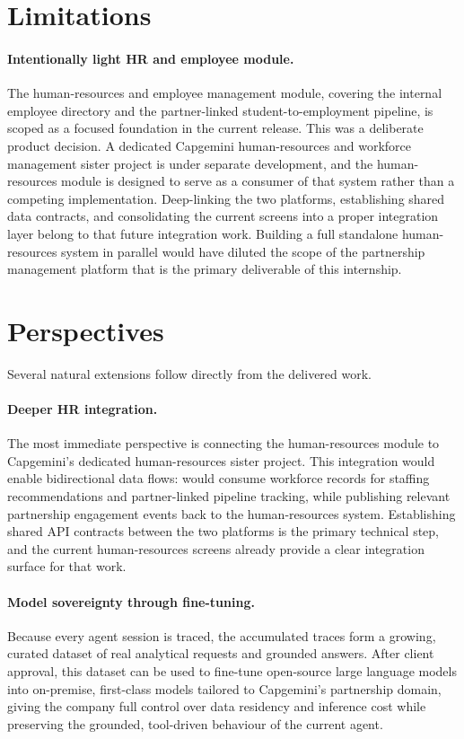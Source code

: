 \section*{Limitations}

\paragraph{Intentionally light HR and employee module.}
The human-resources and employee management module, covering the internal employee directory and the partner-linked student-to-employment pipeline, is scoped as a focused foundation in the current release. This was a deliberate product decision. A dedicated Capgemini human-resources and workforce management sister project is under separate development, and the \projectname{} human-resources module is designed to serve as a consumer of that system rather than a competing implementation. Deep-linking the two platforms, establishing shared data contracts, and consolidating the current screens into a proper integration layer belong to that future integration work. Building a full standalone human-resources system in parallel would have diluted the scope of the partnership management platform that is the primary deliverable of this internship.

\section*{Perspectives}

Several natural extensions follow directly from the delivered work.

\paragraph{Deeper HR integration.}
The most immediate perspective is connecting the human-resources module to Capgemini's dedicated human-resources sister project. This integration would enable bidirectional data flows: \projectname{} would consume workforce records for staffing recommendations and partner-linked pipeline tracking, while publishing relevant partnership engagement events back to the human-resources system. Establishing shared API contracts between the two platforms is the primary technical step, and the current human-resources screens already provide a clear integration surface for that work.

\paragraph{Model sovereignty through fine-tuning.}
Because every agent session is traced, the accumulated traces form a growing, curated dataset of real analytical requests and grounded answers. After client approval, this dataset can be used to fine-tune open-source large language models into on-premise, first-class models tailored to Capgemini's partnership domain, giving the company full control over data residency and inference cost while preserving the grounded, tool-driven behaviour of the current agent.

